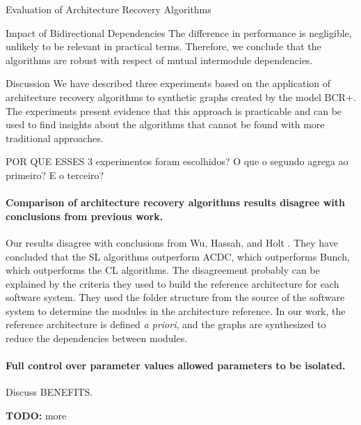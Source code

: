 \documentclass[11pt,twocolumn,a4paper,english]{article}
\newcommand{\TODO}{\textbf{TODO:} }
\begin{document}
\begin{section}{Evaluation of Architecture Recovery Algorithms}
\begin{subsection}{Impact of Bidirectional Dependencies}
	The difference in performance is negligible, unlikely to be relevant in practical terms. Therefore, we conclude that the algorithms are robust with respect of mutual intermodule dependencies.
	
	
\end{subsection}

\begin{subsection}{Discussion} \label{sec:exp:disc}
	We have described three experiments based on the application of architecture recovery algorithms to synthetic graphs created by the model BCR+. The experiments present evidence that this approach is practicable and can be used to find insights about the algorithms that cannot be found with more traditional approaches.
	
	POR QUE ESSES 3 experimentos foram escolhidos? O que o segundo agrega ao primeiro? E o terceiro?
	
\paragraph{Comparison of architecture recovery algorithms results disagree with conclusions from previous work.} Our results disagree with conclusions from Wu, Hassah, and Holt \cite{Wu2005}. They have concluded that the SL algorithms outperform ACDC, which outperforms Bunch, which outperforms the CL algorithms. The disagreement probably can be explained by the criteria they used to build the reference architecture for each software system. They used the folder structure from the source of the software system to determine the modules in the architecture reference. In our work, the reference architecture is defined \textit{a priori}, and the graphs are synthesized to reduce the dependencies between modules.

\paragraph{Full control over parameter values allowed parameters to be  isolated.} Discuss BENEFITS.
	
	\TODO more
	
\end{subsection}

\end{section}
\end{document}
